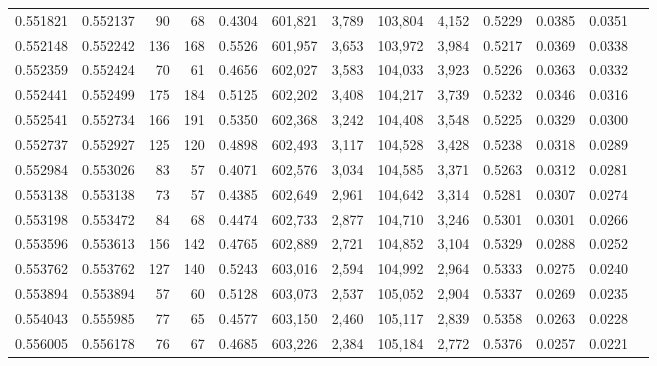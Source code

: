\begin{tabular}{rrrrrrrrrrrrr}
0.551821 & 0.552137 &    90 &    68 &                                     0.4304 & 601,821 &   3,789 & 103,804 &   4,152 & 0.5229 & 0.0385 & 0.0351 \\
0.552148 & 0.552242 &   136 &   168 &                                     0.5526 & 601,957 &   3,653 & 103,972 &   3,984 & 0.5217 & 0.0369 & 0.0338 \\
0.552359 & 0.552424 &    70 &    61 &                                     0.4656 & 602,027 &   3,583 & 104,033 &   3,923 & 0.5226 & 0.0363 & 0.0332 \\
0.552441 & 0.552499 &   175 &   184 &                                     0.5125 & 602,202 &   3,408 & 104,217 &   3,739 & 0.5232 & 0.0346 & 0.0316 \\
0.552541 & 0.552734 &   166 &   191 &                                     0.5350 & 602,368 &   3,242 & 104,408 &   3,548 & 0.5225 & 0.0329 & 0.0300 \\
0.552737 & 0.552927 &   125 &   120 &                                     0.4898 & 602,493 &   3,117 & 104,528 &   3,428 & 0.5238 & 0.0318 & 0.0289 \\
0.552984 & 0.553026 &    83 &    57 &                                     0.4071 & 602,576 &   3,034 & 104,585 &   3,371 & 0.5263 & 0.0312 & 0.0281 \\
0.553138 & 0.553138 &    73 &    57 &                                     0.4385 & 602,649 &   2,961 & 104,642 &   3,314 & 0.5281 & 0.0307 & 0.0274 \\
0.553198 & 0.553472 &    84 &    68 &                                     0.4474 & 602,733 &   2,877 & 104,710 &   3,246 & 0.5301 & 0.0301 & 0.0266 \\
0.553596 & 0.553613 &   156 &   142 &                                     0.4765 & 602,889 &   2,721 & 104,852 &   3,104 & 0.5329 & 0.0288 & 0.0252 \\
0.553762 & 0.553762 &   127 &   140 &                                     0.5243 & 603,016 &   2,594 & 104,992 &   2,964 & 0.5333 & 0.0275 & 0.0240 \\
0.553894 & 0.553894 &    57 &    60 &                                     0.5128 & 603,073 &   2,537 & 105,052 &   2,904 & 0.5337 & 0.0269 & 0.0235 \\
0.554043 & 0.555985 &    77 &    65 &                                     0.4577 & 603,150 &   2,460 & 105,117 &   2,839 & 0.5358 & 0.0263 & 0.0228 \\
0.556005 & 0.556178 &    76 &    67 &                                     0.4685 & 603,226 &   2,384 & 105,184 &   2,772 & 0.5376 & 0.0257 & 0.0221 \\

\end{tabular}

